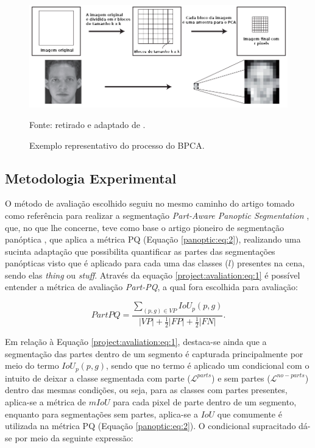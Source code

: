 \begin{figure}[H]
    \centering
    \caption{Exemplo representativo do processo do BPCA.}
    \includegraphics[width=1\textwidth]{recursos/imagens/project/BPCA.png}
    \label{project:pcapooling:fig:3}

    Fonte: retirado e adaptado de \cite{Salvadeo2011}.
\end{figure}

\subsection{Metodologia Experimental}
\label{project:exp_result}
O método de avaliação escolhido seguiu no mesmo caminho do artigo tomado como referência para realizar a segmentação \textit{Part-Aware Panoptic Segmentation} \cite{DeGeus2021}, que, no que lhe concerne, teve como base o artigo pioneiro de segmentação panóptica \cite{Kirillov2019a}, que aplica a métrica PQ (Equação \ref{panoptic:eq:2}), realizando uma sucinta adaptação que possibilita quantificar as partes das segmentações panópticas visto que é aplicado para cada uma das classes ($l$) presentes na cena, sendo elas \textit{thing} ou \textit{stuff}. Através da equação \ref{project:avaliation:eq:1} é possível entender a métrica de avaliação \textit{Part-PQ}, a qual fora escolhida para avaliação:

\begin{equation}
\label{project:avaliation:eq:1}
    PartPQ = \frac{\sum _{(p,g) \in VP} IoU_p(p,g)}{|VP|+ \frac{1}{2}|FP| + \frac{1}{2}|FN|}.
\end{equation}

Em relação à Equação \ref{project:avaliation:eq:1}, destaca-se ainda que a segmentação das partes dentro de um segmento é capturada principalmente por meio do termo $IoU_p(p,g)$, sendo que no termo é aplicado um condicional com o intuito de deixar a classe segmentada com parte ($\mathcal{L}^{parts}$) e sem partes ($\mathcal{L}^{no-parts}$) dentro das mesmas condições, ou seja, para as classes com partes presentes, aplica-se a métrica de $mIoU$ para cada pixel de parte dentro de um segmento, enquanto para segmentações sem partes, aplica-se a $IoU$ que comumente é utilizada na métrica PQ (Equação \ref{panoptic:eq:2}). O condicional supracitado dá-se por meio da seguinte expressão:

